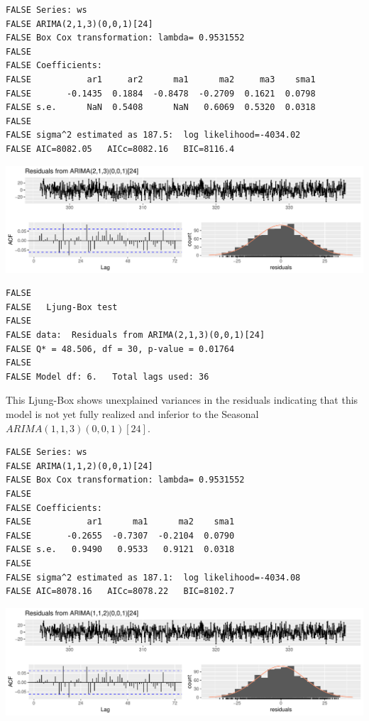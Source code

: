 \documentclass[openany]{book}
\begin{document}
\begin{verbatim}
FALSE Series: ws 
FALSE ARIMA(2,1,3)(0,0,1)[24] 
FALSE Box Cox transformation: lambda= 0.9531552 
FALSE 
FALSE Coefficients:
FALSE           ar1     ar2      ma1      ma2     ma3    sma1
FALSE       -0.1435  0.1884  -0.8478  -0.2709  0.1621  0.0798
FALSE s.e.      NaN  0.5408      NaN   0.6069  0.5320  0.0318
FALSE 
FALSE sigma^2 estimated as 187.5:  log likelihood=-4034.02
FALSE AIC=8082.05   AICc=8082.16   BIC=8116.4
\end{verbatim}

\includegraphics{Part-C-BP_files/figure-latex/unnamed-chunk-11-1.pdf}

\begin{verbatim}
FALSE 
FALSE   Ljung-Box test
FALSE 
FALSE data:  Residuals from ARIMA(2,1,3)(0,0,1)[24]
FALSE Q* = 48.506, df = 30, p-value = 0.01764
FALSE 
FALSE Model df: 6.   Total lags used: 36
\end{verbatim}

This Ljung-Box shows unexplained variances in the residuals indicating
that this model is not yet fully realized and inferior to the Seasonal
\(ARIMA (1,1,3)(0,0,1)[24]\).

\begin{verbatim}
FALSE Series: ws 
FALSE ARIMA(1,1,2)(0,0,1)[24] 
FALSE Box Cox transformation: lambda= 0.9531552 
FALSE 
FALSE Coefficients:
FALSE           ar1      ma1      ma2    sma1
FALSE       -0.2655  -0.7307  -0.2104  0.0790
FALSE s.e.   0.9490   0.9533   0.9121  0.0318
FALSE 
FALSE sigma^2 estimated as 187.1:  log likelihood=-4034.08
FALSE AIC=8078.16   AICc=8078.22   BIC=8102.7
\end{verbatim}

\includegraphics{Part-C-BP_files/figure-latex/unnamed-chunk-12-1.pdf}
\end{document}
